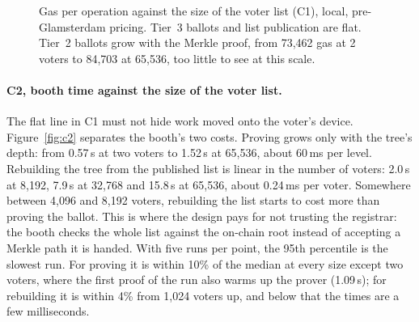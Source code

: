 \begin{figure}[htbp]
  \centering
  \caption{Gas per operation against the size of the voter list (C1), local,
    pre-Glamsterdam pricing. Tier~3 ballots and list publication are flat.
    Tier~2 ballots grow with the Merkle proof, from 73,462 gas at 2 voters to
    84,703 at 65,536, too little to see at this scale.}
  \label{fig:c1}
\end{figure}

\paragraph{C2, booth time against the size of the voter list.}
The flat line in C1 must not hide work moved onto the voter's device.
Figure~\ref{fig:c2} separates the booth's two costs. Proving grows only with
the tree's depth: from 0.57\,s at two voters to 1.52\,s at 65,536, about
60\,ms per level. Rebuilding the tree from the published list is linear in
the number of voters: 2.0\,s at 8,192, 7.9\,s at 32,768 and 15.8\,s at
65,536, about 0.24\,ms per voter. Somewhere between 4,096 and 8,192 voters,
rebuilding the list starts to cost more than proving the ballot. This is where
the design pays for not trusting the registrar: the booth checks the whole list
against the on-chain root instead of accepting a Merkle path it is handed.
With five runs per point, the 95th percentile is the slowest run. For proving
it is within 10\% of the median at every size except two voters, where the
first proof of the run also warms up the prover (1.09\,s); for rebuilding it
is within 4\% from 1,024 voters up, and below that the times are a few
milliseconds.

